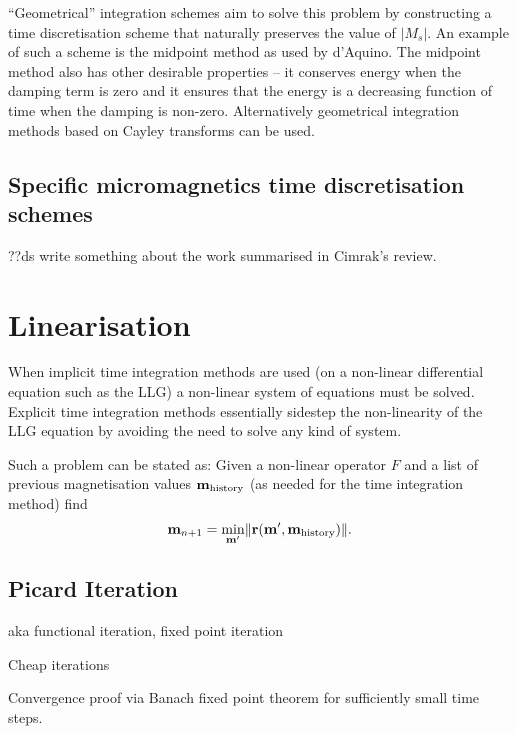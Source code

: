 
``Geometrical'' integration schemes aim to solve this problem by constructing a time discretisation scheme that naturally preserves the value of $|M_s|$. An example of such a scheme is the midpoint method as used by d'Aquino. The midpoint method also has other desirable properties -- it conserves energy when the damping term is zero and it ensures that the energy is a decreasing function of time when the damping is non-zero.\cite{DAquino2005} Alternatively geometrical integration methods based on Cayley transforms can be used.\cite{Lewis2003}\cite{Bottauscio2011}


\subsection{Specific micromagnetics time discretisation schemes}

??ds write something about the work summarised in Cimrak's review.


\section{Linearisation}
\label{sec:linearisation}

When implicit time integration methods are used (on a non-linear differential equation such as the LLG) a non-linear system of equations must be solved.
Explicit time integration methods essentially sidestep the non-linearity of the LLG equation by avoiding the need to solve any kind of system.

Such a problem can be stated as:
Given a non-linear operator $F$ and a list of previous magnetisation values $\mathbf{m}_{\text{history}}$ (as needed for the time integration method) find
\begin{equation}
  \label{eq:non-lin-system}
  \mathbf{m}_{n+1} = \min_{\mathbf{m}'} \lVert \mathbf{r}(\mathbf{m}', \mathbf{m}_{\text{history}}) \rVert.
\end{equation}


\subsection{Picard Iteration}
\label{sec:picard}

aka functional iteration, fixed point iteration

Cheap iterations

Convergence proof via Banach fixed point theorem for sufficiently small time steps.

